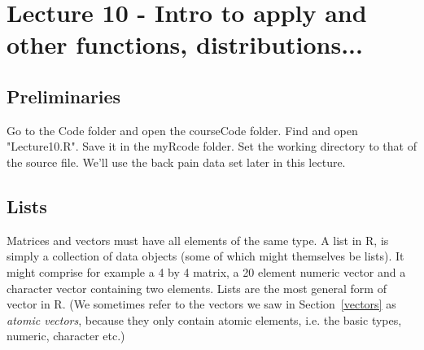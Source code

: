 \documentclass[titlepage]{book}\usepackage{knitr}
\begin{document}







\chapter{Lecture 10 - Intro to apply and other functions, distributions...}\label{L10}

\author{Brian Williams $<$\href{mailto:bjw649@gmail.com}%
{bjw649@gmail.com}$>$}

\section{Preliminaries}
Go to the Code folder and open the courseCode folder.  Find  and open "Lecture10.R". Save it in the myRcode folder. 
Set the working directory to that of the source file.
We'll use the back pain data set later in this lecture.

\begin{knitrout}
\color{fgcolor}\begin{kframe}
\begin{alltt}
\hlstd{(}\hlstd{)}
 \hlkwb{<-} 
\end{alltt}
\end{kframe}
\end{knitrout}


\section{Lists}\label{L2Lists}
Matrices and vectors must have all elements of the same type.  A list in R, is simply a collection of data objects (some of which might themselves be lists). It might comprise for example a 4 by 4 matrix, a 20 element numeric vector and a character vector containing two elements. Lists are the most general form of vector in R.  (We sometimes refer to the vectors we saw in Section~\ref{vectors} as \emph{atomic vectors}, because they only contain atomic elements, i.e. the basic types, numeric, character etc.)
\end{document}
